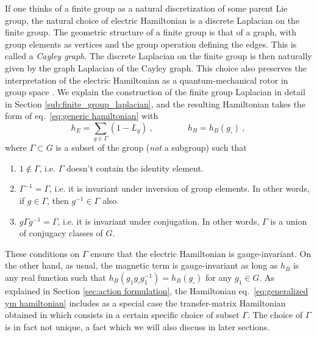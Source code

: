 If one thinks of a finite group as a natural discretization of some parent Lie group, the natural choice of electric Hamiltonian is a discrete Laplacian on the finite group.
The geometric structure of a finite group is that of a graph, with group elements as vertices and the group operation defining the edges.
This is called a \textit{Cayley graph}.
The discrete Laplacian on the finite group is then naturally given by the graph Laplacian of the Cayley graph.
This choice also preserves the interpretation of the electric Hamiltonian as a quantum-mechanical rotor in group space \cite{kogut1975hamiltonian}.
We explain the construction of the finite group Laplacian in detail in Section \ref{sub:finite_group_laplacian}, and the resulting Hamiltonian takes the form of eq.~\eqref{eq:generic hamiltonian} with
\begin{equation}
    \label{eq:generalized ym hamiltonian}
    h_E = \sum_{g \in \Gamma} (1-L_g)  \ , \quad \quad \quad \quad h_B= h_B (g_\square) \ ,
\end{equation}
where $\Gamma \subset G$ is a subset of the group (\textit{not} a subgroup) such that
\begin{enumerate}
    \item $1 \not \in \Gamma$, i.e. $\Gamma$ doesn't contain the identity element.
    \item $\Gamma^{-1}=\Gamma$, i.e. it is invariant under inversion of group elements.
In other words, if $g \in \Gamma$, then $g^{-1} \in \Gamma$ also.
    \item $g \Gamma g^{-1} = \Gamma$, i.e. it is invariant under conjugation.
In other words, $\Gamma$ is a union of conjugacy classes of $G$.
\end{enumerate}
These conditions on $\Gamma$ ensure that the electric Hamiltonian is gauge-invariant.
On the other hand, as usual, the magnetic term is gauge-invariant as long as $h_B$ is any real function such that $h_B(g_1 g_\square g_1^{-1})=h_B(g_\square)$ for any $g_1 \in G$.
As explained in Section \ref{sec:action formulation}, the Hamiltonian eq.~\eqref{eq:generalized ym hamiltonian} includes as a special case the transfer-matrix Hamiltonian obtained in \cite{TransferMatrixFiniteGroup} which consists in a certain specific choice of subset $\Gamma$.
The choice of $\Gamma$ is in fact not unique, a fact which we will also discuss in later sections.

